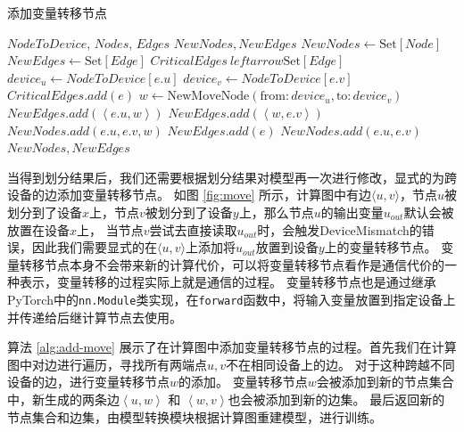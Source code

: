 \begin{algorithm}[!h]
	\caption{添加变量转移节点}
	\label{alg:add-move}
	\begin{algorithmic}[1]
	\REQUIRE $\mathit{NodeToDevice}$, $\mathit{Nodes}$, $\mathit{Edges}$
	\ENSURE $\mathit{NewNodes}, \mathit{NewEdges}$
	\STATE  $\mathit{NewNodes} \leftarrow \mathrm{Set}[\mathit{Node}]$
	\STATE  $\mathit{NewEdges} \leftarrow \mathrm{Set}[\mathit{Edge}]$
	\STATE  $\mathit{CriticalEdges} \ leftarrow \mathrm{Set}[\mathit{Edge}]$
		\STATE $\mathit{device}_u \leftarrow \mathit{NodeToDevice}[e.u]$
		\STATE $\mathit{device}_v \leftarrow \mathit{NodeToDevice}[e.v]$
			\STATE $\mathit{CriticalEdges}.add(e)$
		\ENDIF
	\ENDFOR
			\STATE $w \leftarrow \mathrm{NewMoveNode}(\mathrm{from}:\mathit{device}_u, \mathrm{to}:\mathit{device}_v)$
			\STATE $\mathit{NewEdges}.add(\left\langle e.u,w\right\rangle)$
			\STATE $\mathit{NewEdges}.add(\left\langle w,e.v\right\rangle)$
			\STATE $\mathit{NewNodes}.add(e.u,e.v,w)$
		\ELSE
			\STATE $\mathit{NewEdges}.add(e)$
			\STATE $\mathit{NewNodes}.add(e.u, e.v)$
		\ENDIF
	\ENDFOR
	\RETURN $\mathit{NewNodes}, \mathit{NewEdges}$
	\end{algorithmic}
\end{algorithm}

当得到划分结果后，我们还需要根据划分结果对模型再一次进行修改，显式的为跨设备的边添加变量转移节点。
如图 \ref{fig:move} 所示，计算图中有边$\langle u,v\rangle$，节点$u$被划分到了设备$x$上，节点$v$被划分到了设备$y$上，那么节点$u$的输出变量$u_{out}$默认会被放置在设备$x$上，
当节点$v$尝试去直接读取$u_{out}$时，会触发DeviceMismatch的错误，因此我们需要显式的在$\langle u,v\rangle$上添加将$u_{out}$放置到设备$y$上的变量转移节点。
变量转移节点本身不会带来新的计算代价，可以将变量转移节点看作是通信代价的一种表示，变量转移的过程实际上就是通信的过程。
变量转移节点也是通过继承PyTorch中的\texttt{nn.Module}类实现，在\texttt{forward}函数中，将输入变量放置到指定设备上并传递给后继计算节点去使用。

算法 \ref{alg:add-move} 展示了在计算图中添加变量转移节点的过程。首先我们在计算图中对边进行遍历，寻找所有两端点$u,v$不在相同设备上的边。
对于这种跨越不同设备的边，进行变量转移节点$w$的添加。
变量转移节点$w$会被添加到新的节点集合中，新生成的两条边$\left\langle u,w\right\rangle$ 和 $\left\langle w,v\right\rangle $也会被添加到新的边集。
最后返回新的节点集合和边集，由模型转换模块根据计算图重建模型，进行训练。



